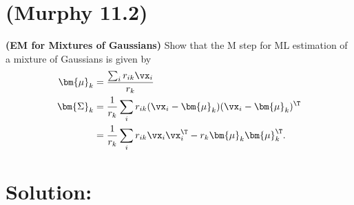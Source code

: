 \documentclass[189]{pset}
\begin{document}

  \section{(Murphy 11.2)}
    \textbf{(EM for Mixtures of Gaussians)} Show that the M step for
    ML estimation of a mixture of Gaussians is given by
    \begin{align*}
      \bm{\mu}_k
      &= \frac{\sum_i r_{ik}\vx_i}{r_k} \\
      \bm{\Sigma}_k
      &= \frac{1}{r_k}\sum_i r_{ik}(\vx_i - \bm{\mu}_k)(\vx_i -
        \bm{\mu}_k)^\T \\
      &= \frac{1}{r_k} \sum_i r_{ik}\vx_i\vx_i^\T - r_k\bm{\mu}_k
        \bm{\mu}_k^\T.
    \end{align*}

  \hrulefill

  \section*{Solution:}
\end{document}
